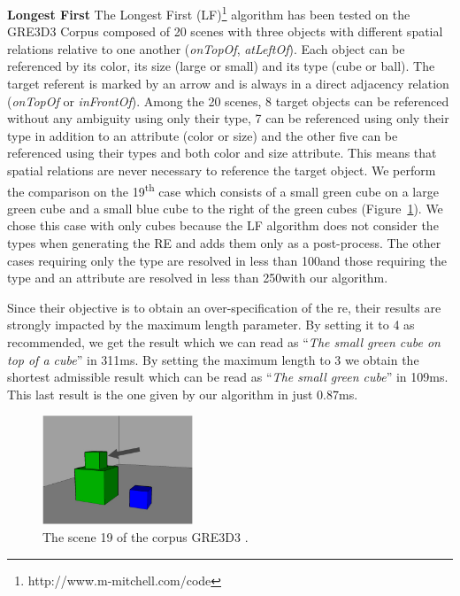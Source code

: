 \documentclass[a4paper,11pt,twoside]{StyleThese}
\begin{document}
\textbf{Longest First} The Longest First (LF)\footnote{http://www.m-mitchell.com/code} algorithm \cite{viethen2013graphs} has been tested on the GRE3D3 Corpus composed of 20 scenes with three objects with different spatial relations relative to one another (\textit{onTopOf}, \textit{atLeftOf}). Each object can be referenced by its color, its size (large or small) and its type (cube or ball). The target referent is marked by an arrow and is always in a direct adjacency relation (\textit{onTopOf} or \textit{inFrontOf}).
Among the 20 scenes, 8 target objects can be referenced without any ambiguity using only their type, 7 can be referenced using only their type in addition to an attribute (color or size) and the other five can be referenced using their types and both color and size attribute. This means that spatial relations are never necessary to reference the target object. 
We perform the comparison on the 19\textsuperscript{th} case which consists of a small green cube on a large green cube and a small blue cube to the right of the green cubes (Figure~\ref{fig:gre3d3}). We chose this case with only cubes because the LF algorithm does not consider the types when generating the RE and adds them only as a post-process. The other cases requiring only the type are resolved in less than 100\us and those requiring the type and an attribute are resolved in less than 250\us with our algorithm.

Since their objective is to obtain an over-specification of the \acrshort{re}, their results are strongly impacted by the maximum length parameter. By setting it to 4 as recommended, we get the result which we can read as ``\textit{The small green cube on top of a cube}'' in 311ms. By setting the maximum length to 3 we obtain the shortest admissible result which can be read as ``\textit{The small green cube}'' in 109ms. This last result is the one given by our algorithm in just 0.87ms.

\begin{figure}[hbtp]
\centering
\includegraphics[width=0.4\textwidth]{figures/chapter3/GRE3D319.jpg}
\caption{The scene 19 of the corpus GRE3D3 \cite{viethen2013graphs}.}
\label{fig:gre3d3}
\end{figure}
\end{document}
